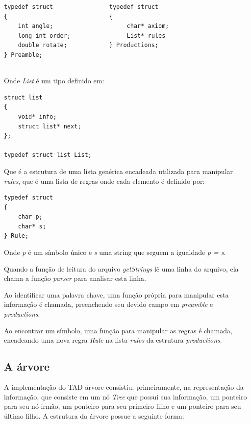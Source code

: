 \documentclass[a4paper,12pt]{article}%
\begin{document}
\begin{verbatim}
typedef struct                typedef struct
{                             {                              
    int angle;                     char* axiom;
    long int order;                List* rules
    double rotate;            } Productions;      
} Preamble;                   
                             
\end{verbatim}

Onde \emph{List} é um tipo definido em:

\begin{verbatim}
struct list                     
{
    void* info;                 
    struct list* next;         
};

typedef struct list List;
\end{verbatim}

Que é a estrutura de uma lista genérica encadeada utilizada para manipular \emph{rules}, que 
é uma lista de regras onde cada elemento é definido por:

\begin{verbatim}
typedef struct                                     
{
    char p;                     
    char* s;                                     
} Rule;
\end{verbatim}

Onde \emph{p} é um símbolo único e \emph{s} uma string que seguem a igualdade \emph{p = s}.

Quando a função de leitura do arquivo \emph{getStrings} lê uma linha do arquivo, 
ela chama a função \emph{parser} para analisar esta linha.

Ao identificar uma palavra chave, uma função própria para manipular esta informação é chamada, preenchendo 
seu devido campo em \emph{preamble} e \emph{productions}.

Ao encontrar um símbolo, uma função para manipular as regras é chamada, encadeando uma nova regra \emph{Rule} 
na lista \emph{rules} da estrutura \emph{productions}.


\subsection{A árvore}

\hspace{1.5em}A implementação do TAD árvore consistiu, primeiramente, na representação da informação, que consiste em um 
nó \emph{Tree} que possui sua informação, um ponteiro para seu nó irmão, um ponteiro para seu primeiro filho e um ponteiro para 
seu último filho. 
\newline
\newline
A estrutura da árvore possue a seguinte forma: 
\end{document}

